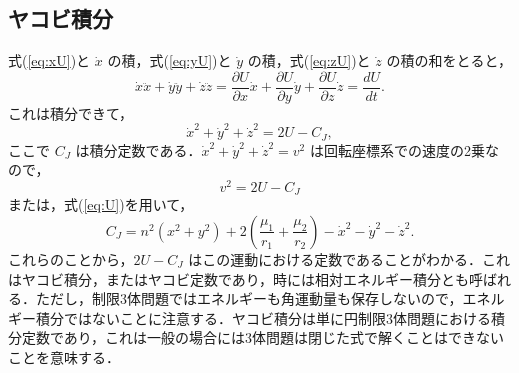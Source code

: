 \documentclass[11pt,a4paper,oneside,onecolumn]{jreport}
\begin{document}
\subsection{ヤコビ積分}
式(\ref{eq:xU})と $\dot{x}$ の積，式(\ref{eq:yU})と $\dot{y}$ の積，式(\ref{eq:zU})と $\dot{z}$ の積の和をとると，
\begin{equation}
\dot{x} \ddot{x} + \dot{y} \ddot{y} + \dot{z} \ddot{z} = \frac{\partial U}{\partial x} \dot{x} + \frac{\partial U}{\partial y} \dot{y} + \frac{\partial U}{\partial z} \dot{z} = \frac{dU}{dt}.
\end{equation}
これは積分できて，
\begin{equation}
\dot{x}^2 + \dot{y}^2 + \dot{z}^2 = 2 U - C_J, \label{eq:2U-C_J}
\end{equation}
ここで $C_J$ は積分定数である．$\dot{x}^2 + \dot{y}^2 + \dot{z}^2 = v^2$ は回転座標系での速度の2乗なので，
\begin{equation}
v^2 = 2 U - C_J
\end{equation}
または，式(\ref{eq:U})を用いて，
\begin{equation}
C_J = n^2 (x^2 + y^2) + 2 \left( \frac{\mu_1}{r_1} + \frac{\mu_2}{r_2} \right) - \dot{x}^2 - \dot{y}^2 - \dot{z}^2.
\end{equation}
これらのことから，$2 U - C_J$ はこの運動における定数であることがわかる．これはヤコビ積分，またはヤコビ定数であり，時には相対エネルギー積分とも呼ばれる．ただし，制限3体問題ではエネルギーも角運動量も保存しないので，エネルギー積分ではないことに注意する．ヤコビ積分は単に円制限3体問題における積分定数であり，これは一般の場合には3体問題は閉じた式で解くことはできないことを意味する．
\end{document}
